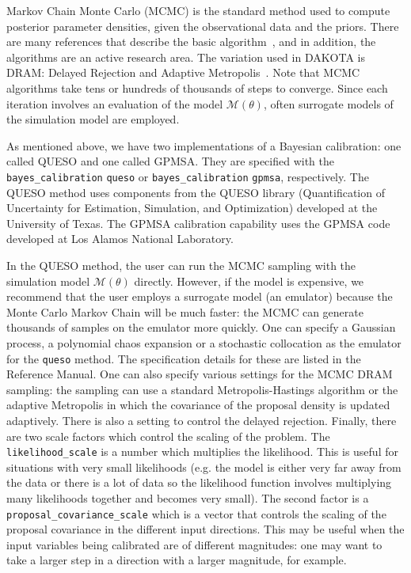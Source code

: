 Markov Chain Monte Carlo (MCMC) is the standard method used to compute 
posterior parameter densities, given the observational data 
and the priors. There are many references that 
describe the basic algorithm~\cite{Gilks}, and in addition, the algorithms 
are an active research area. The variation used in DAKOTA is DRAM: 
Delayed Rejection and Adaptive Metropolis~\cite{Haario}. Note that 
MCMC algorithms take tens or hundreds of thousands of steps to converge. 
Since each iteration involves an evaluation of the model 
$\mathcal{M}(\theta)$, often surrogate models of the simulation 
model are employed.
 
As mentioned above, we have two implementations of a Bayesian 
calibration:  one called QUESO and one called GPMSA.  
They are specified with the \texttt{bayes\_calibration} \texttt{queso}
or \texttt{bayes\_calibration} \texttt{gpmsa}, respectively.
The QUESO method uses components from the QUESO library
(Quantification of Uncertainty for Estimation, Simulation, and
Optimization) developed at the University of Texas.
The GPMSA calibration capability uses the GPMSA code developed at 
Los Alamos National Laboratory.

In the QUESO method, the user can run the MCMC sampling with 
the simulation model $\mathcal{M}(\theta)$ directly.  However, 
if the model is expensive, we recommend that the user employs 
a surrogate model (an emulator) because the Monte Carlo Markov Chain 
will be much faster:  the MCMC can generate thousands of samples 
on the emulator more quickly.  One can specify a Gaussian process,
a polynomial chaos expansion or a stochastic collocation 
as the emulator for the \texttt{queso} method.  The specification 
details for these are listed in the Reference Manual. 
One can also specify various settings for the MCMC DRAM sampling: 
the sampling can use a standard Metropolis-Hastings algorithm 
or the adaptive Metropolis in which the covariance of the proposal 
density is updated adaptively.  There is also a setting to control 
the delayed rejection.  Finally, there are two scale factors 
which control the scaling of the problem.  The 
\texttt{likelihood\_scale} is a number which multiplies the likelihood.  
This is useful for situations with very small likelihoods 
(e.g. the model is either very far away from the data or 
there is a lot of data so the likelihood function 
involves multiplying many likelihoods together and becomes very small).
The second factor is a \texttt{proposal\_covariance\_scale} 
which is a vector that controls the scaling of the proposal covariance
in the different input directions.  This may be useful when the 
input variables being calibrated are of different magnitudes:  
one may want to take a larger step in a direction
with a larger magnitude, for example.
    
